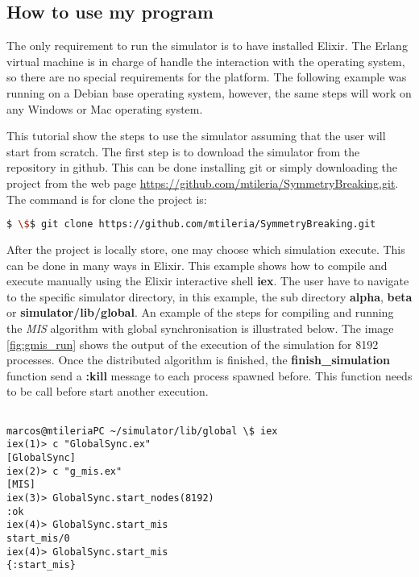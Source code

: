 \subsection{How to use my program}

The only requirement to run the simulator is to have installed Elixir. The Erlang virtual machine is in charge of handle the interaction with the operating system, so there are no special requirements for the platform. The following example was running on a Debian base operating system, however, the same steps will work on any Windows or Mac operating system.     

This tutorial show the steps to use the simulator assuming that the user will start from scratch. The first step is to download the simulator from the repository in github. This can be done installing git or simply downloading the project from the web page \url{https://github.com/mtileria/SymmetryBreaking.git}. The command is for clone the project is:

\begin{lstlisting}[language=bash, columns=fullflexible,mathescape=true]
   $ \$$ git clone https://github.com/mtileria/SymmetryBreaking.git
\end{lstlisting}

After the project is locally store, one may choose which simulation execute. This can be done in many ways in Elixir. This example shows how to compile and execute manually using the Elixir interactive shell \textbf{iex}. The user have to navigate to the specific simulator directory, in this example, the sub directory \textbf{alpha}, \textbf{beta} or \textbf{simulator/lib/global}. An example of the steps for compiling and running the \textit{MIS} algorithm with global synchronisation is illustrated below. The image \ref{fig:gmis_run} shows the output of the execution of the simulation for 8192 processes. Once the distributed algorithm is finished, the \textbf{finish\_simulation} function send a \textbf{:kill} message to each process spawned before. This function needs to be call before start another execution. 


\begin{lstlisting}[style=terminal]

marcos@mtileriaPC ~/simulator/lib/global \$ iex
iex(1)> c "GlobalSync.ex"
[GlobalSync]
iex(2)> c "g_mis.ex"     
[MIS]
iex(3)> GlobalSync.start_nodes(8192)
:ok
iex(4)> GlobalSync.start_mis        
start_mis/0    
iex(4)> GlobalSync.start_mis
{:start_mis}


\end{lstlisting}

